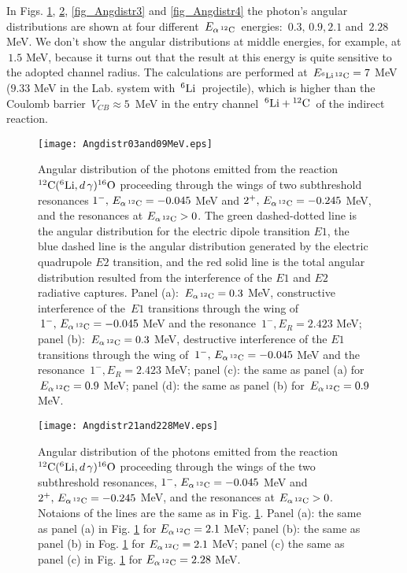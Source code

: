 \documentclass[prl,unsortedaddress,groupedaddress,twocolumn,amsmath,amsfonts,amssymb,showpacs,floatfix,nofootinbib]{revtex4}
\begin{document}
In Figs. \ref{fig_Angdistr1}, \ref{fig_Angdistr2}, \ref{fig_Angdistr3} and \ref{fig_Angdistr4} the photon's angular distributions are shown at four
different $\,E_{\alpha\,{}^{12}{\rm C}}\,$ energies: $\,0.3,\,0.9,2.1$ and $\,2.28$ MeV. 
We don't show the angular distributions at middle energies, for example, at $\,1.5$ MeV, because it turns out that the result at this energy is quite sensitive to the adopted channel radius. The calculations are performed at $\,E_{{}^{6}{\rm Li}\,{}^{12}{\rm C}}=7$ MeV ($9.33$ MeV in the Lab. system with $\,{}^{6}{\rm Li}\,$ projectile), which is higher than the Coulomb barrier $\,V_{CB} \approx 5\,$ MeV in the entry channel $\,{}^{6}{\rm Li} + {}^{12}{\rm C}\,$ of the indirect reaction. 
\begin{figure}
[tbp]   
   \texttt{[image: Angdistr03and09MeV.eps]}
  \caption{Angular distribution of the photons emitted from the reaction ${}^{12}{\rm C}({}^{6}{\rm Li},d\,\gamma){}^{16}{\rm O}$ proceeding through the wings of two subthreshold resonances $1^{-},\,E_{\alpha\,{}^{12}{\rm C}} = -0.045$ MeV and $2^{+},\,E_{\alpha\,{}^{12}{\rm C}}= -0.245$ MeV, and the resonances at $E_{\alpha\,{}^{12}{\rm C}} >0$. The green dashed-dotted line is the angular distribution for the electric dipole transition $E1$, the blue dashed line is the angular distribution generated by the electric quadrupole $E2$ transition, and the red solid line is the total angular distribution resulted from the interference of the $E1$ and $E2$ radiative captures.
Panel (a):  $\,E_{\alpha\,{}^{12}{\rm C}}= 0.3$ MeV, constructive interference of the $\,E1$ transitions through the wing of $\,1^{-},\,E_{\alpha\,{}^{12}{\rm C}} = -0.045$ MeV and the resonance $\,1^{-},E_{R}= 2.423$ MeV; panel (b): $\,E_{\alpha\,{}^{12}{\rm C}}= 0.3$ MeV, destructive interference of the $E1$ transitions through the wing of $\,1^{-},\,E_{\alpha\,{}^{12}{\rm C}} = -0.045$ MeV and the resonance $\,1^{-},E_{R}= 2.423$ MeV;  panel (c): the same as panel (a) for $\,E_{\alpha\,{}^{12}{\rm C}}= 0.9$ MeV; panel (d): the same as panel (b) for $\,E_{\alpha\,{}^{12}{\rm C}}= 0.9$ MeV.}  \label{fig_Angdistr1}
\end{figure}

\begin{figure}
[tbp] 
 \texttt{[image: Angdistr21and228MeV.eps]}
 \caption{Angular distribution of the photons emitted from the reaction ${}^{12}{\rm C}({}^{6}{\rm Li},d\,\gamma){}^{16}{\rm O}$ proceeding through the wings of the two subthreshold resonances, $1^{-},\,E_{\alpha\,{}^{12}{\rm C}} = -0.045$ MeV and $2^{+},\,E_{\alpha\,{}^{12}{\rm C}}= -0.245$ MeV,  and the resonances at $E_{\alpha\,{}^{12}{\rm C}} >0$. Notaions of the lines are the same as in Fig. \ref{fig_Angdistr1}. 
Panel (a): the same as panel (a) in Fig. \ref{fig_Angdistr1} for $E_{\alpha\,{}^{12}{\rm C}}= 2.1$ MeV; panel (b): the same as panel (b) in Fog. \ref{fig_Angdistr1} for $E_{\alpha\,{}^{12}{\rm C}}= 2.1$ MeV;
panel (c) the same as panel (c) in Fig. \ref{fig_Angdistr1} for $E_{\alpha\,{}^{12}{\rm C}}= 2.28$ MeV.}\label{fig_Angdistr2}
\end{figure}
\end{document}

